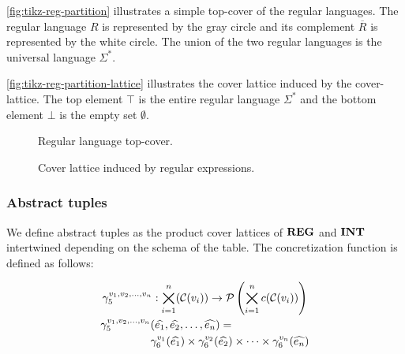 
\autoref{fig:tikz-reg-partition} illustrates a simple top-cover of the regular languages.
The regular language $R$ is represented by the gray circle and its complement $\overline{R}$ is represented by the white circle.
The union of the two regular languages is the universal language $\Sigma^*$.

\autoref{fig:tikz-reg-partition-lattice} illustrates the cover lattice induced by the cover-lattice.
The top element $\top$ is the entire regular language $\Sigma^*$ and the bottom element $\bot$ is the empty set $\emptyset$.


\begin{figure}
    \center
    
    \caption{Regular language top-cover.}
    \label{fig:tikz-reg-partition}
\end{figure}

\begin{figure}[!htb]
    \center
    
    \caption{Cover lattice induced by regular expressions.}
    \label{fig:tikz-reg-partition-lattice}
\end{figure}

\subsubsection{Abstract tuples}\label{subsubsec:abstract-tuples}
We define abstract tuples as the product cover lattices of $\mathbf{REG}$ and $\mathbf{INT}$ intertwined depending on the schema of the table.
The concretization function is defined as follows:


\begin{gather}
    \gamma^{v_1, v_2, \dots, v_n}_5 : \bigtimes_{i = 1}^{n}(\mathcal{C}(v_i)) \rightarrow \mathcal{P}\left(\bigtimes_{i = 1}^n c(\mathcal{C}(v_i)) \right)\\
    \begin{split}
        \gamma^{v_1, v_2, \dots, v_n}_5 & (\widehat{e_1}, \widehat{e_2}, \dots, \widehat{e_n}) = \\
         &\gamma^{v_1}_6(\widehat{e_1}) \times \gamma^{v_2}_6(\widehat{e_2}) \times \dots \times \gamma^{v_n}_6(\widehat{e_n})
    \end{split}
\end{gather}

